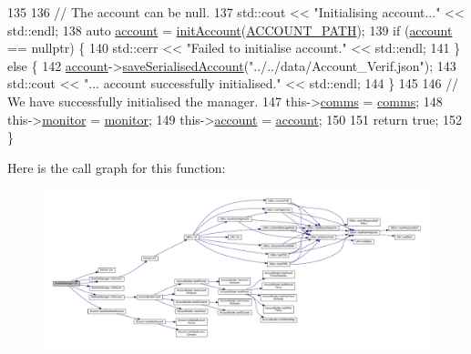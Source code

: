 \begin{DoxyCode}
135 
136     \textcolor{comment}{// The account can be null.}
137     std::cout << \textcolor{stringliteral}{"Initialising account..."} << std::endl;
138     \textcolor{keyword}{auto} \hyperlink{class_bee_safe_manager_a52bc9bc8c1ea9608b83d603b142443b0}{account} = \hyperlink{class_bee_safe_manager_a7395aeacd246ce69c65f255a2eab1d04}{initAccount}(\hyperlink{_bee_safe_8cpp_aeadb35b2afa47797b56f17423460fad8}{ACCOUNT\_PATH});
139     \textcolor{keywordflow}{if} (\hyperlink{class_bee_safe_manager_a52bc9bc8c1ea9608b83d603b142443b0}{account} == \textcolor{keyword}{nullptr}) \{
140         std::cerr << \textcolor{stringliteral}{"Failed to initialise account."} << std::endl;
141     \} \textcolor{keywordflow}{else} \{
142         \hyperlink{class_bee_safe_manager_a52bc9bc8c1ea9608b83d603b142443b0}{account}->\hyperlink{class_account_a9ff3a257536bc933e0a39207bb89243d}{saveSerialisedAccount}(\textcolor{stringliteral}{"../../data/Account\_Verif.json"});
143         std::cout << \textcolor{stringliteral}{"... account successfully initialised."} << std::endl;
144     \}
145 
146     \textcolor{comment}{// We have successfully initialised the manager.}
147     this->\hyperlink{class_bee_safe_manager_a80b19afbb679d08be14d67a45447f9e1}{comms} = \hyperlink{class_bee_safe_manager_a80b19afbb679d08be14d67a45447f9e1}{comms};
148     this->\hyperlink{class_bee_safe_manager_a3b885b4fb364228c914095f2e670f9af}{monitor} = \hyperlink{class_bee_safe_manager_a3b885b4fb364228c914095f2e670f9af}{monitor};
149     this->\hyperlink{class_bee_safe_manager_a52bc9bc8c1ea9608b83d603b142443b0}{account} = \hyperlink{class_bee_safe_manager_a52bc9bc8c1ea9608b83d603b142443b0}{account};
150 
151     \textcolor{keywordflow}{return} \textcolor{keyword}{true};
152 \}
\end{DoxyCode}
Here is the call graph for this function\+:
\nopagebreak
\begin{figure}[H]
\begin{center}
\leavevmode
\includegraphics[width=350pt]{d5/d75/class_bee_safe_manager_a2f16b09c454e21c887d14ac5483973cf_cgraph}
\end{center}
\end{figure}
